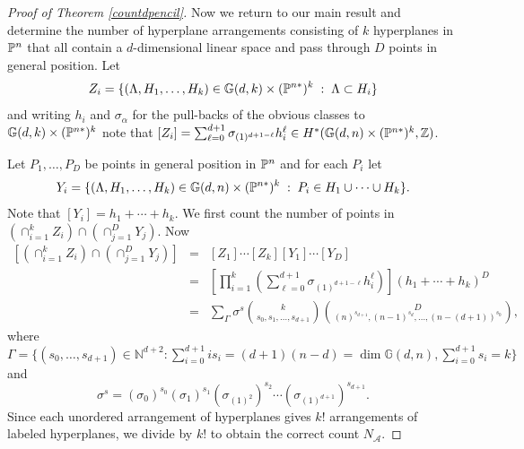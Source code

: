 \documentclass[12pt]{article}
\theoremstyle{plain}
\theoremstyle{definition}
\newcommand{\A}{\mathcal{A}}
\newcommand{\N}{N}
\newcommand{\NN}{\mathbb{N}}
\newcommand{\Z}{\mathbb{Z}}
\newcommand{\G}{\mathbb{G}}
\renewcommand{\P}{\ensuremath \mathbb{P}}
\begin{document}
\begin{proof}[Proof of Theorem \ref{countdpencil}]

Now we return to our main result and determine the number of
hyperplane arrangements consisting of $k$ hyperplanes in $\P^n$ that
all contain a $d$-dimensional linear space and pass through $D$ points
in general position. Let $$ Z_i = \{(\Lambda, H_1, \ldots, H_k) \in
\G(d,k) \times (\P^{n*})^k \; : \; \Lambda \subset H_i \} $$ and
writing $h_i$ and $\sigma_\alpha$ for the pull-backs of the obvious
classes to $\G(d,k) \times (\P^{n*})^k$ note that $[Z_i]
=\sum_{\ell=0}^{d+1} \sigma_{(1)^{d+1-\ell}} h_i^{\ell} \in H^*( \G(d,n) \times
(\P^{n*})^k,\Z)$. 

Let $P_1,\ldots, P_D$ be points in general position in $\P^n$ and for
each $P_i$ let $$ Y_i = \{(\Lambda, H_1,\ldots, H_k)
\in \G(d,n) \times (\P^{n*})^k \; : \; P_i \in H_1 \cup \cdots \cup H_k \}. $$ Note that $[Y_i] =
h_1+\cdots+h_k.$ We first count the number of points in
$\left( \cap_{i=1}^k Z_i \right) \cap \left( \cap_{j=1}^{D} Y_j
\right)$. Now  
$$ \begin{array}{lll} [\left( \cap_{i=1}^k Z_i \right) \cap \left( \cap_{j=1}^{D} Y_j
\right)] & = & [Z_1] \cdots [Z_k] [Y_1] \cdots [Y_D] \\
 & = & \left[ \prod_{i=1}^k \left( \sum_{\ell=0}^{d+1} \sigma_{(1)^{d+1-\ell}} h_i^{\ell} \right) \right] \left(
  h_1+\cdots+h_k \right)^{D} \\
& = & \sum_{\Gamma}
\sigma^{s} \binom{k}{s_0,s_1,\ldots,s_{d+1}}
\binom{D}{(n)^{s_{d+1}},(n-1)^{s_{d}},\ldots,(n-(d+1))^{s_0}},
\end{array} $$
where $\Gamma = \{(s_0,\ldots,s_{d+1}) \in \NN^{d+2}: \sum_{i=0}^{d+1} is_i =
(d+1)(n-d) = \dim \G(d,n),
  \sum_{i=0}^{d+1} s_i = k\}$ and $$\sigma^{s} = (\sigma_0)^{s_0}
  (\sigma_1)^{s_1} (\sigma_{(1)^2})^{s_2} \cdots
  (\sigma_{(1)^{d+1}})^{s_{d+1}}.$$ 
Since each unordered arrangement of hyperplanes gives $k!$
arrangements of labeled hyperplanes, we divide by $k!$ to obtain the
correct count $\N_\A$.  





\end{proof}
\end{document}
